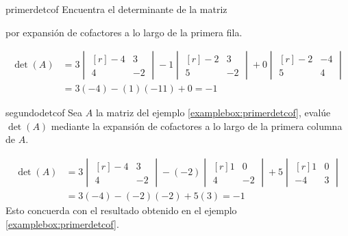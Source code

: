\begin{examplebox}{}{primerdetcof}
    Encuentra el determinante de la matriz
    \begin{matrizn}
    \end{matrizn}
    por expansión de cofactores a lo largo de la primera fila.

    \tcblower
    \solucion
    \begin{align*}
        \det(A) & = 3 \begin{vmatrix*}[r]
            -4 & 3 \\
            4 & -2
        \end{vmatrix*} - 1 \begin{vmatrix*}[r]
            -2 & 3 \\
            5 & -2
        \end{vmatrix*} + 0 \begin{vmatrix*}[r]
            -2 & -4 \\
            5 & 4
        \end{vmatrix*} \\
        & = 3(-4) - (1)(-11) + 0 = -1
    \end{align*}
\end{examplebox}

\newpage

\begin{examplebox}{}{segundodetcof}
    Sea $A$ la matriz del ejemplo \ref{examplebox:primerdetcof}, evalúe $\det(A)$ mediante la expansión de cofactores a lo largo de la primera columna de $A$.

    \tcblower
    \solucion
    \begin{align*}
        \det(A) & = 3 \begin{vmatrix*}[r]
            -4 & 3 \\
            4 & -2
        \end{vmatrix*} - (-2) \begin{vmatrix*}[r]
            1 & 0 \\
            4 & -2
        \end{vmatrix*} + 5 \begin{vmatrix*}[r]
            1 & 0 \\
            -4 & 3
        \end{vmatrix*} \\
        & = 3(-4) - (-2)(-2) + 5(3) = -1
    \end{align*}
    Esto concuerda con el resultado obtenido en el ejemplo \ref{examplebox:primerdetcof}.
\end{examplebox}

